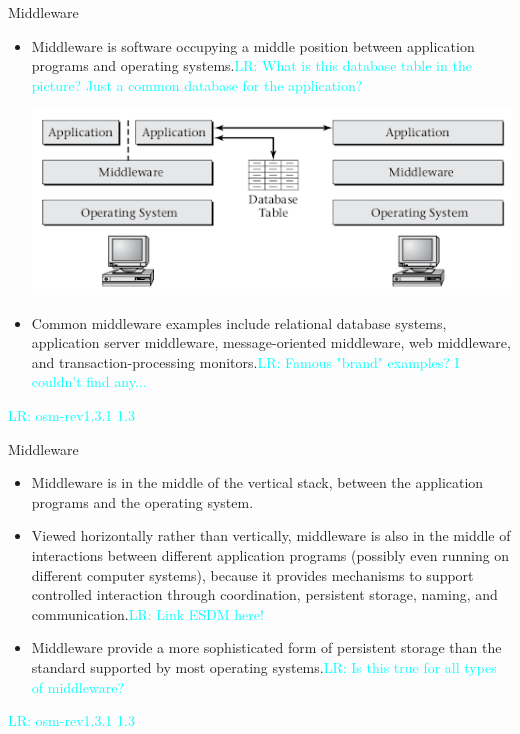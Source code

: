 \documentclass[compress,11pt,xcolor=svgnames,aspectratio=169]{beamer}
\newcommand{\lr}[1]{\textcolor{cyan}{LR: #1}}
\begin{document}
\begin{frame}[fragile] {Middleware}

\begin{itemize}
\setlength\itemsep{0.4cm}

  \item Middleware is software occupying a middle position between application programs and operating systems.\lr{What is this database table in the picture? Just a common database for the application?}

  \begin{center}
  \includegraphics[scale=0.5]{fig/middleware}
  \end{center}

  \item Common middleware examples include relational database systems, application server middleware, message-oriented middleware, web middleware, and transaction-processing monitors.\lr{Famous "brand" examples? I couldn't find any...}

\end{itemize}

\lr{osm-rev1.3.1 1.3}

\end{frame}

\begin{frame}[fragile] {Middleware}

\begin{itemize}
\setlength\itemsep{0.6cm}

  \item Middleware is in the middle of the vertical stack, between the application programs and the operating system.

  \item Viewed horizontally rather than vertically, middleware is also in the middle of interactions between different application programs (possibly even running on different computer systems), because it provides mechanisms to support controlled interaction through coordination, persistent storage, naming, and communication.\lr{Link ESDM here!}

  \item Middleware provide a more sophisticated form of persistent storage than the standard supported by most operating systems.\lr{Is this true for all types of middleware?}

\end{itemize}

\lr{osm-rev1.3.1 1.3}

\end{frame}
\end{document}
